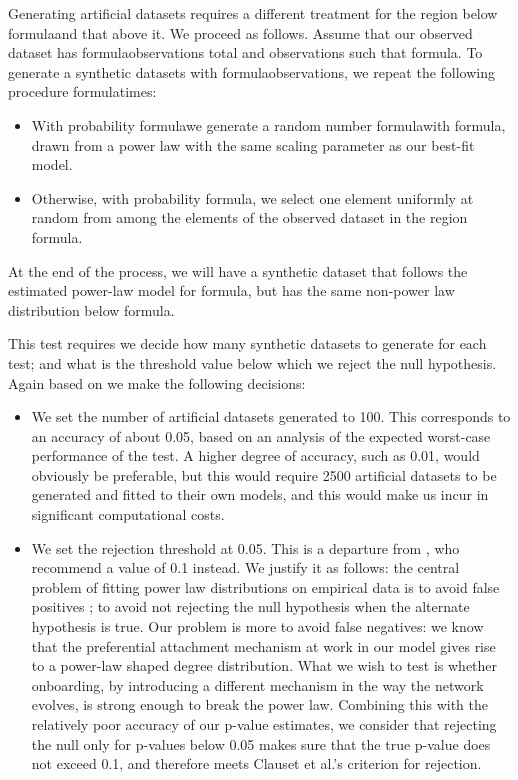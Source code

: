Generating artificial datasets requires a different treatment for the region below formulaand that above it. We proceed as follows. Assume that our observed dataset has formulaobservations total and observations such that formula. To generate a synthetic datasets with formulaobservations, we repeat the following procedure formulatimes:
\begin{itemize}
\item With probability formulawe generate a random number formulawith formula, drawn from a power law with the same scaling parameter as our best-fit model.
\item Otherwise, with probability formula, we select one element uniformly at random from among the elements of the observed dataset in the region formula.
\end{itemize}

At the end of the process, we will have a synthetic dataset that follows the estimated power-law model for formula, but has the same non-power law distribution below formula.

This test requires we decide how many synthetic datasets to generate for each test; and what is the threshold value below which we reject the null hypothesis. Again based on \cite{champernowne1953model} we make the following decisions:

\begin{itemize}
\item We set the number of artificial datasets generated to 100. This corresponds to an accuracy of about 0.05, based on an analysis of the expected worst-case performance of the test. A  higher degree of accuracy, such as 0.01, would obviously be preferable, but this would require 2500 artificial datasets to be generated and fitted to their own models, and this would make us incur in significant computational costs.
\item We set the rejection threshold at 0.05. This is a departure from \cite{champernowne1953model}, who recommend a value of 0.1 instead. We justify it as follows: the central problem of fitting power law distributions on empirical data is to avoid false positives \cite{milligan2013patterns, shum2003roots}; to avoid not rejecting the null hypothesis when the alternate hypothesis is true. Our problem is more to avoid false negatives: we know that the preferential attachment mechanism at work in our model gives rise to a power-law shaped degree distribution. What we wish to test is whether onboarding, by introducing a different mechanism in the way the network evolves, is strong enough to break the power law. Combining this with the relatively poor accuracy of our p-value estimates, we consider that rejecting the null only for p-values below 0.05 makes sure that the true p-value does not exceed 0.1, and therefore meets Clauset et al.'s criterion for rejection.
\end{itemize}

